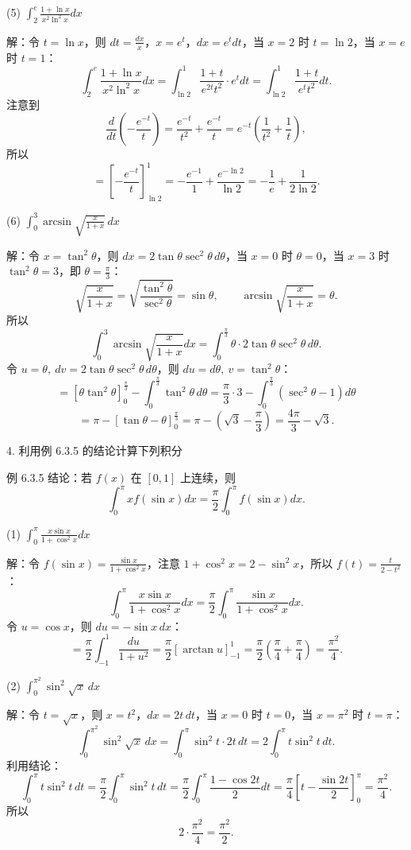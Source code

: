 (5) \(\int_{2}^{e}\frac{1+\ln x}{x^{2}\ln^{2}x}dx\)

解：令 \(t=\ln x\)，则 \(dt=\frac{dx}{x}\)，\(x=e^{t}\)，\(dx=e^{t}dt\)，当 \(x=2\) 时 \(t=\ln2\)，当 \(x=e\) 时 \(t=1\)：
\[ \int_{2}^{e}\frac{1+\ln x}{x^{2}\ln^{2}x}dx=\int_{\ln2}^{1}\frac{1+t}{e^{2t}t^{2}}\cdot e^{t}dt=\int_{\ln2}^{1}\frac{1+t}{e^{t}t^{2}}dt. \]
注意到
\[ \frac{d}{dt}\left(-\frac{e^{-t}}{t}\right)=\frac{e^{-t}}{t^{2}}+\frac{e^{-t}}{t}=e^{-t}\left(\frac{1}{t^{2}}+\frac{1}{t}\right), \]
所以
\[ =\left[-\frac{e^{-t}}{t}\right]_{\ln2}^{1}=-\frac{e^{-1}}{1}+\frac{e^{-\ln2}}{\ln2}=-\frac{1}{e}+\frac{1}{2\ln2}. \]

(6) \(\int_{0}^{3}\arcsin\sqrt{\frac{x}{1+x}}\,dx\)

解：令 \(x=\tan^{2}\theta\)，则 \(dx=2\tan\theta\sec^{2}\theta\,d\theta\)，当 \(x=0\) 时 \(\theta=0\)，当 \(x=3\) 时 \(\tan^{2}\theta=3\)，即 \(\theta=\frac{\pi}{3}\)：
\[ \sqrt{\frac{x}{1+x}}=\sqrt{\frac{\tan^{2}\theta}{\sec^{2}\theta}}=\sin\theta,\qquad \arcsin\sqrt{\frac{x}{1+x}}=\theta. \]
所以
\[ \int_{0}^{3}\arcsin\sqrt{\frac{x}{1+x}}dx=\int_{0}^{\frac{\pi}{3}}\theta\cdot2\tan\theta\sec^{2}\theta\,d\theta. \]
令 \(u=\theta,\ dv=2\tan\theta\sec^{2}\theta\,d\theta\)，则 \(du=d\theta,\ v=\tan^{2}\theta\)：
\[ =\left[\theta\tan^{2}\theta\right]_{0}^{\frac{\pi}{3}}-\int_{0}^{\frac{\pi}{3}}\tan^{2}\theta\,d\theta=\frac{\pi}{3}\cdot3-\int_{0}^{\frac{\pi}{3}}(\sec^{2}\theta-1)d\theta \]
\[ =\pi-\left[\tan\theta-\theta\right]_{0}^{\frac{\pi}{3}}=\pi-\left(\sqrt3-\frac{\pi}{3}\right)=\frac{4\pi}{3}-\sqrt3. \]

4. 利用例 6.3.5 的结论计算下列积分

例 6.3.5 结论：若 \(f(x)\) 在 \([0,1]\) 上连续，则
\[ \int_{0}^{\pi}xf(\sin x)dx=\frac{\pi}{2}\int_{0}^{\pi}f(\sin x)dx. \]

(1) \(\int_{0}^{\pi}\frac{x\sin x}{1+\cos^{2}x}dx\)

解：令 \(f(\sin x)=\frac{\sin x}{1+\cos^{2}x}\)，注意 \(1+\cos^{2}x=2-\sin^{2}x\)，所以 \(f(t)=\frac{t}{2-t^{2}}\)：
\[ \int_{0}^{\pi}\frac{x\sin x}{1+\cos^{2}x}dx=\frac{\pi}{2}\int_{0}^{\pi}\frac{\sin x}{1+\cos^{2}x}dx. \]
令 \(u=\cos x\)，则 \(du=-\sin x\,dx\)：
\[ =\frac{\pi}{2}\int_{-1}^{1}\frac{du}{1+u^{2}}=\frac{\pi}{2}\left[\arctan u\right]_{-1}^{1}=\frac{\pi}{2}\left(\frac{\pi}{4}+\frac{\pi}{4}\right)=\frac{\pi^{2}}{4}. \]

(2) \(\int_{0}^{\pi^{2}}\sin^{2}\sqrt{x}\,dx\)

解：令 \(t=\sqrt{x}\)，则 \(x=t^{2}\)，\(dx=2t\,dt\)，当 \(x=0\) 时 \(t=0\)，当 \(x=\pi^{2}\) 时 \(t=\pi\)：
\[ \int_{0}^{\pi^{2}}\sin^{2}\sqrt{x}\,dx=\int_{0}^{\pi}\sin^{2}t\cdot2t\,dt=2\int_{0}^{\pi}t\sin^{2}t\,dt. \]
利用结论：
\[ \int_{0}^{\pi}t\sin^{2}t\,dt=\frac{\pi}{2}\int_{0}^{\pi}\sin^{2}t\,dt=\frac{\pi}{2}\int_{0}^{\pi}\frac{1-\cos2t}{2}dt=\frac{\pi}{4}\left[t-\frac{\sin2t}{2}\right]_{0}^{\pi}=\frac{\pi^{2}}{4}. \]
所以
\[ 2\cdot\frac{\pi^{2}}{4}=\frac{\pi^{2}}{2}. \]

